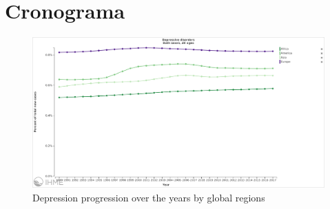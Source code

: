 \documentclass[11pt, notitlepage]{article} %
\begin{document}
\section*{Cronograma}

\appendix
\newpage
\begin{figure}
	\centering
	\includegraphics[scale=.225]{Figures/depressionprogression.png}
	\caption{Depression progression over the years by global regions} 
	\label{fig:depressionmap}
\end{figure}
\section{}


% 
\end{document}
